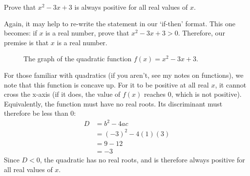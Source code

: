 \begin{exercise}[Easy]
  Prove that $x^2 - 3x + 3$ is always positive for all real values of $x$. 
\end{exercise}
\begin{answer}
  Again, it may help to re-write the statement in our `if-then' format. This one becomes: 
  if $x$ is a real number, prove that $x^2 - 3x + 3 > 0$. Therefore, our premise is that $x$ is a real number.
  
  \begin{figure}[H]
    \centering
    \caption{The graph of the quadratic function $f(x) = x^2 - 3x + 3$.}
  \end{figure}
  For those familiar with quadratics (if you aren't, see my notes on functions), we note that this function is concave up. 
  For it to be positive at all real $x$, it cannot cross the x-axis (if it does, the value of $f(x)$ reaches $0$, which is not positive). 
  Equivalently, the function must have no real roots. Its discriminant must therefore be less than 0:
  \begin{align*}
    D &= b^2 - 4ac \\
      &= (-3)^2 - 4(1)(3) \\
      &= 9 - 12 \\
      &= -3
  \end{align*}
  Since $D < 0$, the quadratic has no real roots, and is therefore always positive for all real values of $x$.
\end{answer}